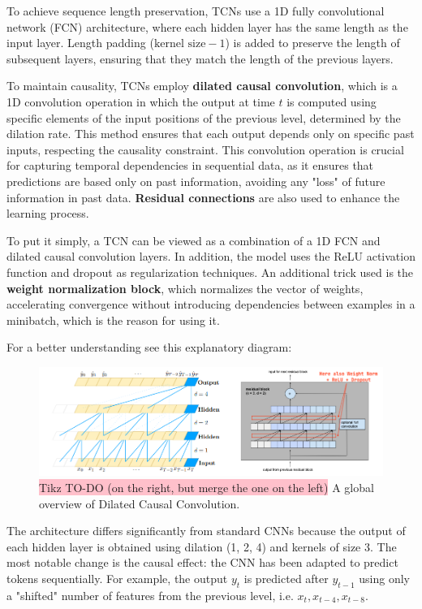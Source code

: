 To achieve sequence length preservation, TCNs use a 1D fully convolutional network (FCN) architecture, where each hidden layer has the same length as the input layer. Length padding ($\text{kernel size} - 1$) is added to preserve the length of subsequent layers, ensuring that they match the length of the previous layers.

To maintain causality, TCNs employ \textbf{dilated causal convolution}, which is a 1D convolution operation in which the output at time $t$ is computed using specific elements of the input positions of the previous level, determined by the dilation rate. This method ensures that each output depends only on specific past inputs, respecting the causality constraint. This convolution operation is crucial for capturing temporal dependencies in sequential data, as it ensures that predictions are based only on past information, avoiding any "loss" of future information in past data. \textbf{Residual connections} are also used to enhance the learning process.

To put it simply, a TCN can be viewed as a combination of a 1D FCN and dilated causal convolution layers. In addition, the model uses the ReLU activation function and dropout as regularization techniques. An additional trick used is the \textbf{weight normalization block}, which normalizes the vector of weights, accelerating convergence without introducing dependencies between examples in a minibatch, which is the reason for using it.

For a better understanding see this explanatory diagram:

\begin{figure}[!htbp]
    \centering
    \includegraphics[width=0.95\linewidth]{tikz/chapter8 - Temporal Convolutional Network.png}
    \caption{{\color{red}\colorbox{pink}{Tikz TO-DO (on the right, but merge the one on the left)}} A global overview of Dilated Causal Convolution.}
\end{figure}

The architecture differs significantly from standard CNNs because the output of each hidden layer is obtained using dilation (1, 2, 4) and kernels of size 3. The most notable change is the causal effect: the CNN has been adapted to predict tokens sequentially. For example, the output $y_t$ is predicted after $y_{t-1}$ using only a "shifted" number of features from the previous level, i.e. $x_t, x_{t-4}, x_{t-8}$.


